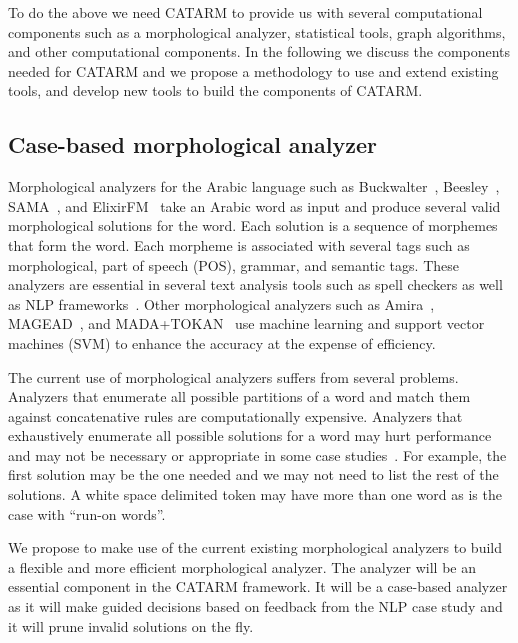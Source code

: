 \documentclass[12pt]{article}
\begin{document}
To do the above we need CATARM to provide us with several 
computational components such as a morphological analyzer, 
statistical tools, graph algorithms, and other computational
components. 
In the following we discuss the components needed for 
CATARM and we propose a methodology to 
use and extend existing tools, and develop new tools to
build the components of CATARM.

\subsection{Case-based morphological analyzer}
\label{s:design:ma}

Morphological analyzers for the Arabic language
such as Buckwalter~\cite{Buckwalter:02},
Beesley~\cite{Beesley:01}, SAMA~\cite{Kulick:10},
and ElixirFM~\cite{Otakar:07} take an Arabic word as input
and produce several valid morphological solutions for the word. 
Each solution is a sequence of morphemes that form the word.
Each morpheme is associated with several tags such as 
morphological, part of speech (POS), grammar, and semantic tags. 
These analyzers are essential in several text analysis tools such 
as spell checkers as well as NLP frameworks~\cite{Col09}.
Other morphological analyzers such as 
Amira~\cite{Diab:07,Benajiba:07},
MAGEAD~\cite{Habash:05}, and MADA+TOKAN~\cite{Habash:09} 
use machine learning and support vector machines (SVM) 
to enhance the accuracy at the expense of efficiency.

The current use of morphological analyzers suffers from 
several problems. 
Analyzers that enumerate all possible partitions of a word
and match them against concatenative rules are computationally 
expensive. 
Analyzers that exhaustively enumerate all possible solutions 
for a word may hurt performance and may
not be necessary or appropriate in some case studies~\cite{Maamouri:10}. 
For example, the first solution may be the one needed and 
we may not need to list the rest of the solutions. 
A white space delimited token may have more than one word
as is the case with ``run-on words''.

We propose to make use of the current existing morphological
analyzers to build a flexible and more efficient
morphological analyzer. 
The analyzer will be an essential
component in the CATARM framework. 
It will be a case-based analyzer as it will make guided decisions
based on feedback from the NLP case study and it will prune
invalid solutions on the fly. 
\end{document}
